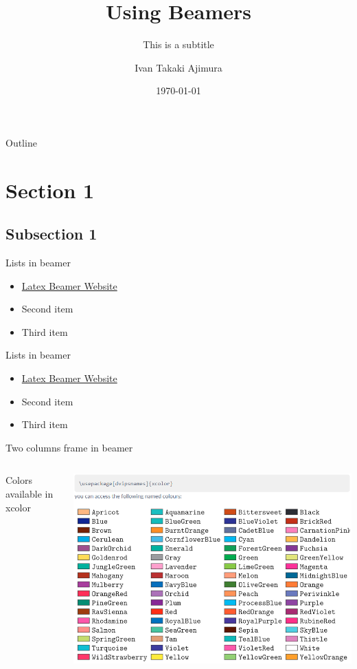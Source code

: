 \documentclass{beamer}
\title{Using Beamers}
\subtitle{This is a subtitle}
\author{Ivan Takaki Ajimura}
\institute{University of Coimbra}
\date{\today}
\begin{document}
\begin{frame}
    \titlepage
\end{frame}

\begin{frame}{Outline}
    \tableofcontents
\end{frame}

\section{Section 1}
\subsection{Subsection 1}

\begin{frame}{Lists in beamer}
\begin{itemize}
    \item \href{https://latex-beamer.com/}{Latex Beamer Website}
    \item Second item
    \item Third item
\end{itemize}
\end{frame}

\begin{frame}{Lists in beamer}
\begin{itemize}[<+->]
    \item \href{https://latex-beamer.com/}{Latex Beamer Website}
    \item Second item
    \item Third item
\end{itemize}
\end{frame}

\begin{frame}{Two columns frame in beamer}
\begin{columns}
\begin{column}{0.5\textwidth}
    Colors available in xcolor
\end{column}
\begin{column}{0.5\textwidth}
    \includegraphics[scale=0.3]{figures/xcolors.png}
\end{column}
\end{columns}
\end{frame}
\end{document}
